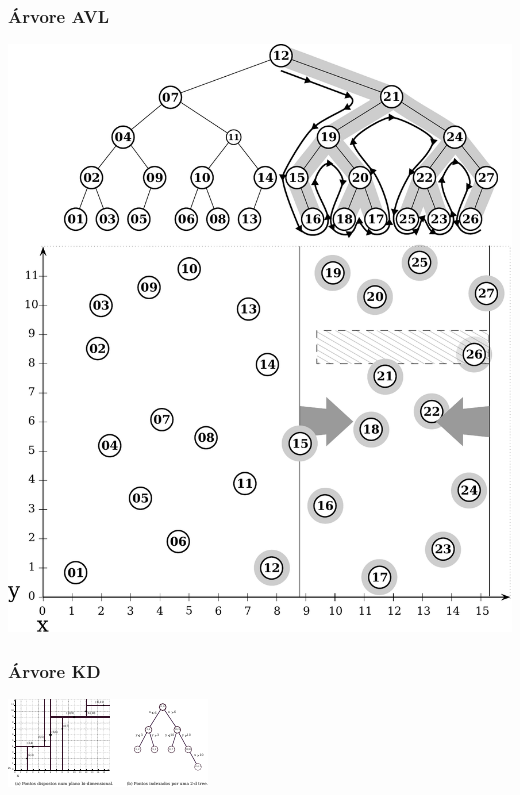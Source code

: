 \documentclass[10pt,xcolor=table,fleqn]{beamer}
\begin{document}
\begin{frame}
  \frametitle{Árvore AVL}
  \begin{center}
    \includegraphics[scale=0.3]{../img/points-query/avl/points-avl-query}
  \end{center}
\end{frame}


\begin{frame}
  \frametitle{Árvore KD}
  \begin{center}
    \includegraphics[scale=2.5]{../img/kdt/dom-kd}
  \end{center}
\end{frame}
\end{document}
